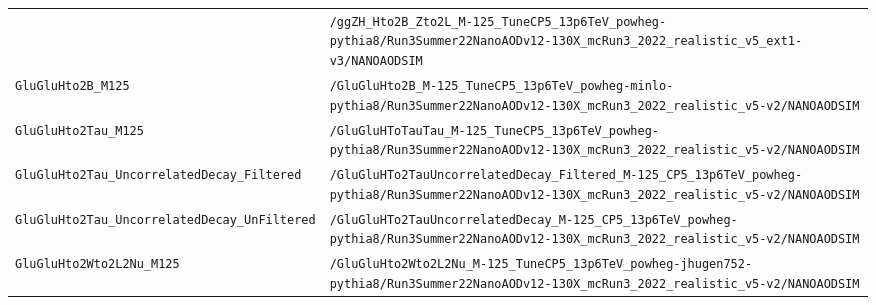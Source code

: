 \begin{longtable}{@{}>{\RaggedRight\arraybackslash}p{} >{\RaggedRight\arraybackslash}p{}@{}}
 & \texttt{/\allowbreak{}ggZH\_\allowbreak{}Hto2B\_\allowbreak{}Zto2L\_\allowbreak{}M-\allowbreak{}125\_\allowbreak{}TuneCP5\_\allowbreak{}13p6TeV\_\allowbreak{}powheg-\allowbreak{}pythia8/\allowbreak{}Run3Summer22NanoAODv12-\allowbreak{}130X\_\allowbreak{}mcRun3\_\allowbreak{}2022\_\allowbreak{}realistic\_\allowbreak{}v5\_\allowbreak{}ext1-\allowbreak{}v3/\allowbreak{}NANOAODSIM} \\
\addlinespace[2pt]
\texttt{GluGluHto2B\_\allowbreak{}M125} & \texttt{/\allowbreak{}GluGluHto2B\_\allowbreak{}M-\allowbreak{}125\_\allowbreak{}TuneCP5\_\allowbreak{}13p6TeV\_\allowbreak{}powheg-\allowbreak{}minlo-\allowbreak{}pythia8/\allowbreak{}Run3Summer22NanoAODv12-\allowbreak{}130X\_\allowbreak{}mcRun3\_\allowbreak{}2022\_\allowbreak{}realistic\_\allowbreak{}v5-\allowbreak{}v2/\allowbreak{}NANOAODSIM} \\
\addlinespace[2pt]
\texttt{GluGluHto2Tau\_\allowbreak{}M125} & \texttt{/\allowbreak{}GluGluHToTauTau\_\allowbreak{}M-\allowbreak{}125\_\allowbreak{}TuneCP5\_\allowbreak{}13p6TeV\_\allowbreak{}powheg-\allowbreak{}pythia8/\allowbreak{}Run3Summer22NanoAODv12-\allowbreak{}130X\_\allowbreak{}mcRun3\_\allowbreak{}2022\_\allowbreak{}realistic\_\allowbreak{}v5-\allowbreak{}v2/\allowbreak{}NANOAODSIM} \\
\addlinespace[2pt]
\texttt{GluGluHto2Tau\_\allowbreak{}UncorrelatedDecay\_\allowbreak{}Filtered} & \texttt{/\allowbreak{}GluGluHTo2TauUncorrelatedDecay\_\allowbreak{}Filtered\_\allowbreak{}M-\allowbreak{}125\_\allowbreak{}CP5\_\allowbreak{}13p6TeV\_\allowbreak{}powheg-\allowbreak{}pythia8/\allowbreak{}Run3Summer22NanoAODv12-\allowbreak{}130X\_\allowbreak{}mcRun3\_\allowbreak{}2022\_\allowbreak{}realistic\_\allowbreak{}v5-\allowbreak{}v2/\allowbreak{}NANOAODSIM} \\
\addlinespace[2pt]
\texttt{GluGluHto2Tau\_\allowbreak{}UncorrelatedDecay\_\allowbreak{}UnFiltered} & \texttt{/\allowbreak{}GluGluHTo2TauUncorrelatedDecay\_\allowbreak{}M-\allowbreak{}125\_\allowbreak{}CP5\_\allowbreak{}13p6TeV\_\allowbreak{}powheg-\allowbreak{}pythia8/\allowbreak{}Run3Summer22NanoAODv12-\allowbreak{}130X\_\allowbreak{}mcRun3\_\allowbreak{}2022\_\allowbreak{}realistic\_\allowbreak{}v5-\allowbreak{}v2/\allowbreak{}NANOAODSIM} \\
\addlinespace[2pt]
\texttt{GluGluHto2Wto2L2Nu\_\allowbreak{}M125} & \texttt{/\allowbreak{}GluGluHto2Wto2L2Nu\_\allowbreak{}M-\allowbreak{}125\_\allowbreak{}TuneCP5\_\allowbreak{}13p6TeV\_\allowbreak{}powheg-\allowbreak{}jhugen752-\allowbreak{}pythia8/\allowbreak{}Run3Summer22NanoAODv12-\allowbreak{}130X\_\allowbreak{}mcRun3\_\allowbreak{}2022\_\allowbreak{}realistic\_\allowbreak{}v5-\allowbreak{}v2/\allowbreak{}NANOAODSIM} \\

\end{longtable}
